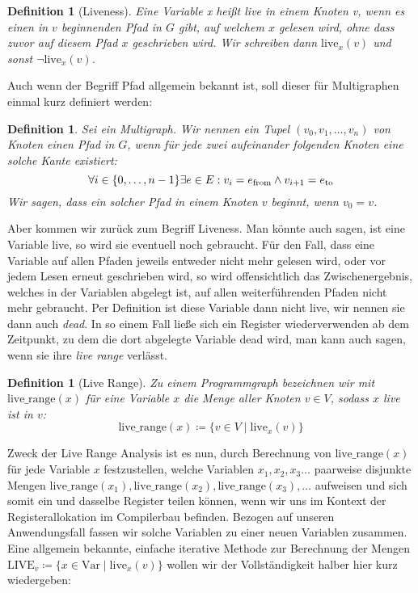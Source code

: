 \documentclass[a4paper]{article}
\newtheorem{definition}[satz]{Definition} %
\theoremstyle{nonumberplain}
\begin{document}
\begin{definition}[Liveness]
	Eine Variable \textit{x} heißt \textit{live} in einem Knoten \textit{v}, wenn es einen in $v$ beginnenden Pfad in $G$ gibt, auf welchem $x$ gelesen wird, ohne dass zuvor auf diesem Pfad $x$ geschrieben wird. Wir schreiben dann $\textrm{live}_x(v)$ und sonst $\neg \textrm{live}_x(v)$.
\end{definition}

Auch wenn der Begriff Pfad allgemein bekannt ist, soll dieser für Multigraphen einmal kurz definiert werden:

\begin{definition}
	Sei \mgtup{} ein Multigraph. Wir nennen ein Tupel $(v_0,v_1, \dots, v_n)$ von Knoten einen \emph{Pfad} in $G$, wenn für jede zwei aufeinander folgenden Knoten eine solche Kante existiert:
	\begin{equation*}
		\forall i \in \{0, \dots, n-1\} \exists e \in E : v_i = e_{\mathrm{from}} \land v_{i+1} = e_{\mathrm{to}}
	\end{equation*}
	Wir sagen, dass ein solcher Pfad in einem Knoten $v$ \emph{beginnt}, wenn $v_0 = v$.
\end{definition}

Aber kommen wir zurück zum Begriff Liveness. Man könnte auch sagen, ist eine Variable live, so wird sie eventuell noch gebraucht. Für den Fall, dass eine Variable auf allen Pfaden jeweils entweder nicht mehr gelesen wird, oder vor jedem Lesen erneut geschrieben wird, so wird offensichtlich das Zwischenergebnis, welches in der Variablen abgelegt ist, auf allen weiterführenden Pfaden nicht mehr gebraucht. Per Definition ist diese Variable dann nicht live, wir nennen sie dann auch \textit{dead}. In so einem Fall ließe sich ein Register wiederverwenden ab dem Zeitpunkt, zu dem die dort abgelegte Variable dead wird, man kann auch sagen, wenn sie ihre \textit{live range} verlässt.

\begin{definition}[Live Range]
	Zu einem Programmgraph \mgtup{} bezeichnen wir mit $\textrm{live\_range}(x)$ für eine Variable $x$ die Menge aller Knoten $v\in V$, sodass $x$ live ist in $v$:
	\[
	\textrm{live\_range}(x) \coloneqq \{v\in V \mid \textrm{live}_x(v) \}
	\]
\end{definition}

Zweck der Live Range Analysis ist es nun, durch Berechnung von $\textrm{live\_range}(x)$ für jede Variable $x$ festzustellen, welche Variablen $x_1, x_2, x_3 \dots$  paarweise disjunkte Mengen $\textrm{live\_range}(x_1), \textrm{live\_range}(x_2), \textrm{live\_range}(x_3), \dots$ aufweisen und sich somit ein und dasselbe Register teilen können, wenn wir uns im Kontext der Registerallokation im Compilerbau befinden. Bezogen auf unseren Anwendungsfall fassen wir solche Variablen zu einer neuen Variablen zusammen.
Eine allgemein bekannte, einfache iterative Methode \cite{liveanalysis} zur Berechnung der Mengen $\textrm{LIVE}_v \coloneqq \{ x \in \mathrm{Var} \mid \textrm{live}_x(v) \}$ wollen wir der Vollständigkeit halber hier kurz wiedergeben:
\end{document}
